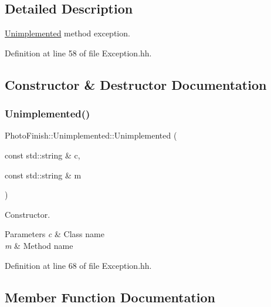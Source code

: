 \subsection{Detailed Description}
\hyperlink{class_photo_finish_1_1_unimplemented}{Unimplemented} method exception. 

Definition at line 58 of file Exception.\+hh.



\subsection{Constructor \& Destructor Documentation}
\mbox{\label{class_photo_finish_1_1_unimplemented_ac1b14d17ed2585ed91d51b54defa190c}} 
\subsubsection{\texorpdfstring{Unimplemented()}{Unimplemented()}}
{\footnotesize\ttfamily Photo\+Finish\+::\+Unimplemented\+::\+Unimplemented (\begin{DoxyParamCaption}\item[{const std\+::string \&}]{c,  }\item[{const std\+::string \&}]{m }\end{DoxyParamCaption})\hspace{0.3cm}{\ttfamily [inline]}}



Constructor. 


\begin{DoxyParams}{Parameters}
{\em c} & Class name \\
\hline
{\em m} & Method name \\
\hline
\end{DoxyParams}


Definition at line 68 of file Exception.\+hh.



\subsection{Member Function Documentation}
\mbox{\label{class_photo_finish_1_1_unimplemented_a7fd6d687bffc73a91b289c3e7cf76170}} 
